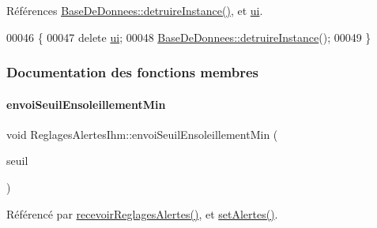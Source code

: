 Références \hyperlink{class_base_de_donnees_a457401c0816b888c77ce915997545f4e}{Base\+De\+Donnees\+::detruire\+Instance()}, et \hyperlink{class_reglages_alertes_ihm_af3a1fcc84fb1c76248b330372947b245}{ui}.


\begin{DoxyCode}
00046 \{
00047     \textcolor{keyword}{delete} \hyperlink{class_reglages_alertes_ihm_af3a1fcc84fb1c76248b330372947b245}{ui};
00048     \hyperlink{class_base_de_donnees_a457401c0816b888c77ce915997545f4e}{BaseDeDonnees::detruireInstance}();
00049 \}
\end{DoxyCode}


\subsubsection{Documentation des fonctions membres}
\mbox{\label{class_reglages_alertes_ihm_a1ff9b472f2eed0efece54da863497324}} 
\paragraph{\texorpdfstring{envoi\+Seuil\+Ensoleillement\+Min}{envoiSeuilEnsoleillementMin}}
{\footnotesize\ttfamily void Reglages\+Alertes\+Ihm\+::envoi\+Seuil\+Ensoleillement\+Min (\begin{DoxyParamCaption}\item[{Q\+String}]{seuil }\end{DoxyParamCaption})\hspace{0.3cm}{\ttfamily [signal]}}



Référencé par \hyperlink{class_reglages_alertes_ihm_a5c40f718b28b948a90574ef0c2d3e587}{recevoir\+Reglages\+Alertes()}, et \hyperlink{class_reglages_alertes_ihm_aeb0331a6103f944cb15cdd62985ca231}{set\+Alertes()}.

\mbox{\label{class_reglages_alertes_ihm_a1455ae71d0e6c33b7857a23d116f3248}} 
